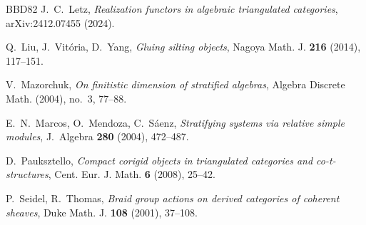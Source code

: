 \documentclass[11pt,reqno]{amsart}
\theoremstyle{plain}
\theoremstyle{definition}
\theoremstyle{remark}
\begin{document}
\begin{thebibliography}{BBD82}
J.~C.~Letz, \emph{Realization functors in algebraic triangulated categories}, arXiv:2412.07455 (2024).

Q.~Liu, J.~Vit\'oria, D.~Yang, \emph{Gluing silting objects}, Nagoya Math. J. \textbf{216} (2014), 117--151.

V.~Mazorchuk, \emph{On finitistic dimension of stratified algebras}, Algebra Discrete Math. (2004), no.~3, 77--88.

E.~N.~Marcos, O.~Mendoza, C.~S\'aenz, \emph{Stratifying systems via relative simple modules}, J.~Algebra \textbf{280} (2004), 472--487.

D.~Pauksztello, \emph{Compact corigid objects in triangulated categories and co-t-structures}, Cent. Eur. J. Math. \textbf{6} (2008), 25--42.

P.~Seidel, R.~Thomas, \emph{Braid group actions on derived categories of coherent sheaves}, Duke Math. J. \textbf{108} (2001), 37--108.

\end{thebibliography}
\end{document}
